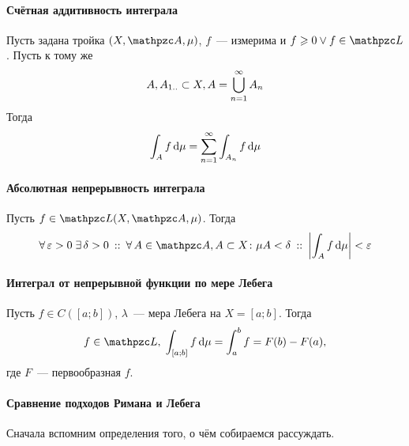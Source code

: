 \documentclass[12pt, timbord]{longnotes}
\begin{document}
\paragraph{Счётная аддитивность интеграла}
\begin{thrm}\label{thrm:meas::infadd}
  Пусть задана тройка $(X,\alg,\mu)$, $f$~--- измерима и $f \geqslant 0 \lor f \in \summb$. 
  Пусть к тому же 
  \[
    A, A_{1\intrng} \subset X, A = \bigcup_{n=1}^\infty A_n
  \]
  Тогда 
  \[
    \int _A f \, \mathrm{d} \mu = \sum_{n=1}^\infty \int _{A_n} f\, \mathrm{d} \mu 
  \]
\end{thrm}

\paragraph{Абсолютная непрерывность интеграла}
\begin{thrm}\label{thrm:meas::abscont}
  Пусть $f\in \summb(X,\alg,\mu)$. Тогда
  \[
    \forall\, \varepsilon > 0 \; \exists\, \delta > 0 \that \forall\, A \in \alg , A \subset X
    \colon \mu A < \delta \holds \left| \int_A f \, \del \mu \right| < \varepsilon 
  \]
\end{thrm}

\paragraph{Интеграл от непрерывной функции по мере Лебега}
\label{par:meas::contint}

\begin{thrm}\label{thrm:meas::contint}
  Пусть $f \in C([a;b])$, $\lambda$~--- мера Лебега на $X = [a;b]$. Тогда
  \[
    f \in \summb , \; \int_{[a;b]} f \, \del \mu = \int_a ^b f = F(b) - F(a),
  \]
  где $F$~--- первообразная $f$.
\end{thrm}

\paragraph{Сравнение подходов Римана и Лебега}
\label{par:meas::rimleb}

Сначала вспомним определения того, о чём собираемся рассуждать.
\end{document}
